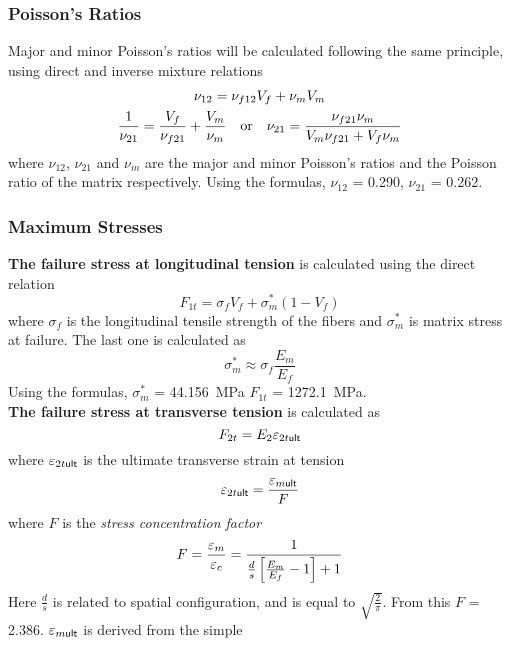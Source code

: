 \documentclass[a4paper,twosided,11pt,DIV14]{scrartcl}
\newcommand{\veps}{\vareps}
\begin{document}
\subsubsection{Poisson's Ratios}
%
Major and minor Poisson's ratios will be calculated following the same
principle, using direct and inverse mixture relations
%
\begin{gather}
  \nu_{12} = \nu_{f12} V_f + \nu_m V_m\\
  \frac{1}{\nu_{21}} = \frac{V_f}{\nu_{f21}} + \frac{V_m}{\nu_m}
  \quad\textup{or}\quad
  \nu_{21} = \frac{\nu_{f21} \nu_m}{V_m\nu_{f21}+V_f\nu_m}
\end{gather}
%
where $\nu_{12}$, $\nu_{21}$ and $\nu_m$ are the major and minor Poisson's
ratios and the Poisson ratio of the matrix respectively. Using the formulas,
$\nu_{12}$ = 0.290, $\nu_{21}$ = 0.262.
%
\subsubsection{Maximum Stresses}
\textbf{The failure stress at longitudinal tension} is calculated using the direct relation
%
\begin{equation}
  F_{1t} = \sigma_f V_f  + \sigma_m^{*} (1-V_f)
\end{equation}
where $\sigma_f$ is the longitudinal tensile strength of the
fibers and $\sigma_m^{*}$ is matrix stress at failure. The last one is
calculated as
\begin{equation}
  \sigma_m^{*} \approx \sigma_f \frac{E_m}{E_f}
\end{equation}
Using the formulas, $\sigma_m^{*}$ = \SI{44.156}{MPa} $F_{1t}$ = \SI{1272.1}{MPa}.
%
\\\textbf{The failure stress at transverse tension} is calculated as
%
\begin{equation}
  F_{2t} = E_{2} \veps_{2t\textsf{ult}}
\end{equation}
%
where $\veps_{2t\textsf{ult}}$ is the ultimate transverse strain at tension
%
\begin{equation}
  \veps_{2t\textsf{ult}} = \frac{\veps_{m\textsf{ult}}}{F}
\end{equation}
%
where $F$ is the \emph{stress concentration factor}
%
\begin{equation}
  F = \frac{\veps_m}{\veps_c} = \frac{1}{\frac{d}{s}\sbr{\frac{E_m}{E_f}-1}+1}
\end{equation}
%
Here $\frac{d}{s}$ is related to spatial configuration, and is equal to
$\sqrt{\frac{2}{\pi}}$. From this $F$ = 2.386.
$\veps_{m\textsf{ult}}$ is derived from the simple
\end{document}
